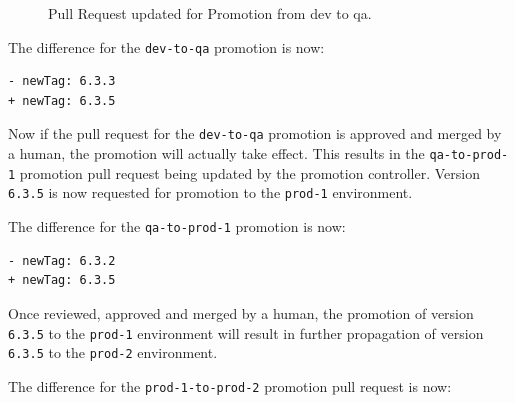 \begin{figure}[h]
	\centering
	\caption{Pull Request updated for Promotion from dev to qa.
	}
	\label{fig:prom-pr-dev-to-qa-round2}	
\end{figure}

The difference for the \lstinline|dev-to-qa| promotion is now:

\begin{lstlisting}
- newTag: 6.3.3
+ newTag: 6.3.5
\end{lstlisting}


Now if the pull request for the \lstinline|dev-to-qa| promotion
is approved and merged by a human,
the promotion will actually take effect.
This results in the \lstinline|qa-to-prod-1| promotion pull request being updated
by the promotion controller.
Version \lstinline|6.3.5| is now requested for promotion to the
\lstinline|prod-1| environment.

The difference for the \lstinline|qa-to-prod-1| promotion is now:

\begin{lstlisting}
- newTag: 6.3.2
+ newTag: 6.3.5
\end{lstlisting}

Once reviewed, approved and merged by a human,
the promotion of version \lstinline|6.3.5| to the \lstinline|prod-1| environment
will result in further propagation of version \lstinline|6.3.5|
to the \lstinline|prod-2| environment.

The difference for the \lstinline|prod-1-to-prod-2| promotion pull request is now:

